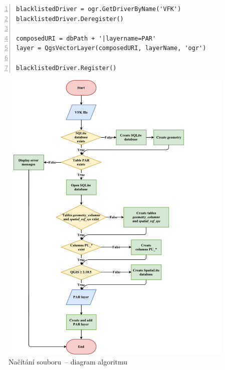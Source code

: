 {\scriptsize
\begin{lstlisting}[style=python, caption={Vytvoření QGIS vrstvy parcel pomocí SQLite Driveru}, captionpos=b, label=vytvoreni_vrstvy_parcel_pomoci_sqlite, backgroundcolor = \color{light-gray},  numbers=left]
blacklistedDriver = ogr.GetDriverByName('VFK')
blacklistedDriver.Deregister()

composedURI = dbPath + '|layername=PAR'
layer = QgsVectorLayer(composedURI, layerName, 'ogr')
	
blacklistedDriver.Register()
\end{lstlisting}}

	\begin{figure}[H]
		\centering
		\includegraphics[width=1.2\textwidth]{./pictures/nacitani_vfk_souboru.pdf}
		\caption[Načítání  souboru~– diagram algoritmu]{Načítání  souboru~– diagram algoritmu}
		\label{fig:diagram_nacitani_vfk}
 	\end{figure}

